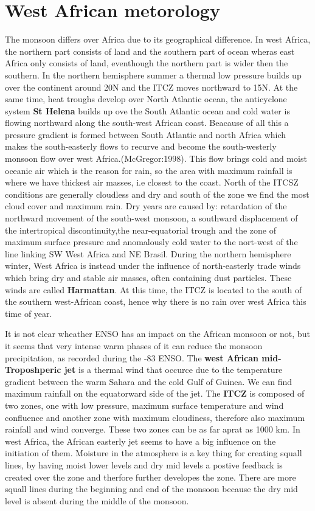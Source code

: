 \documentclass{article}
\begin{document}
	\section{West African metorology}
	The monsoon differs over Africa due to its geographical difference. In west Africa, the northern part consists of land and the southern part of ocean wheras east Africa only consists of land, eventhough the northern part is wider then the southern. In the northern hemisphere summer a thermal low pressure builds up over the continent around 20\textdegree N and the ITCZ moves northward to 15\textdegree N. At the same time, heat troughs develop over North Atlantic ocean, the anticyclone system \textbf{St Helena} builds up ove the South Atlantic ocean and cold water is flowing northward along the south-west African coast. Beacause of all this a pressure gradient is formed between South Atlantic and north Africa which makes the south-easterly flows to recurve and become the south-westerly monsoon flow over west Africa.(McGregor:1998). This flow brings cold and moist oceanic air which is the reason for rain, so the area with maximum rainfall is where we have thickest air masses, i.e closest to the coast. North of the ITCSZ conditions are generally cloudless and dry and south of the zone we find the most cloud cover and maximum rain. Dry years are caused by: retardation of the northward movement of the south-west monsoon, a southward displacement of the intertropical discontinuity,the near-equatorial trough and the zone of maximum surface pressure and anomalously cold water to the nort-west of the line linking SW West Africa and NE Brasil. 
	During the northern hemisphere winter, West Africa is instead under the influence of  north-easterly trade winds which bring dry and stable air masses, often containing dust particles. These winds are called \textbf{Harmattan}. At this time, the ITCZ is located to the south of the southern west-African coast, hence why there is no rain over west Africa this time of year. 
	
	It is not clear wheather ENSO has an impact on the African monsoon or not, but it seems that very intense warm phases of it can reduce the monsoon precipitation, as recorded during the -83 ENSO. The \textbf{west African mid-Troposhperic jet} is a thermal wind that occurce due to the temperature gradient between the warm Sahara and the cold Gulf of Guinea. We can find maximum rainfall on the equatorward side of the jet. The \textbf{ITCZ} is composed of two zones, one with low pressure, maximum surface temperature and wind confluence and another zone with maximum cloudiness, therefore also maximum rainfall and wind converge. These two zones can be as far aprat as 1000 km. 
	 In west Africa, the African easterly jet seems to have a big influence on the initiation of them. Moisture in the atmosphere is a key thing for creating squall lines, by having moist lower levels and dry mid levels a postive feedback is created over the zone and therfore further developes the zone. There are more squall lines during the beginning and end of the monsoon because the dry mid level is absent during the middle of the monsoon. 
	
\end{document}
